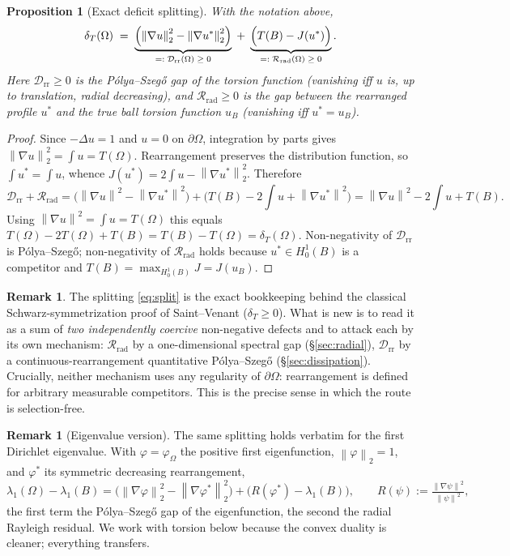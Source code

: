 \documentclass[11pt]{article}
\newtheorem{proposition}[theorem]{Proposition}
\theoremstyle{definition}
\newtheorem{remark}[theorem]{Remark}
\newcommand{\Om}{\Omega}
\newcommand{\Drr}{\mathcal D_{\mathrm{rr}}}
\newcommand{\Rrad}{\mathcal R_{\mathrm{rad}}}
\newcommand{\dT}{\delta_T}
\newcommand{\norm}[1]{\left\|#1\right\|}
\begin{document}
\begin{proposition}[Exact deficit splitting]\label{prop:split}
With the notation above,
\begin{equation}\label{eq:split}
   \dT(\Om)\;=\;\underbrace{\Bigl(\norm{\nabla u}_2^2-\norm{\nabla u^*}_2^2\Bigr)}_{=:\;\Drr(\Om)\;\ge\;0}
   \;+\;\underbrace{\Bigl(T(B)-J(u^*)\Bigr)}_{=:\;\Rrad(\Om)\;\ge\;0}.
\end{equation}
Here $\Drr\ge0$ is the Pólya--Szegő gap of the torsion function (vanishing
iff $u$ is, up to translation, radial decreasing), and $\Rrad\ge0$ is the
gap between the rearranged profile $u^*$ and the true ball torsion function
$u_B$ (vanishing iff $u^*=u_B$).
\end{proposition}

\begin{proof}
Since $-\Delta u=1$ and $u=0$ on $\partial\Om$, integration by parts gives
$\norm{\nabla u}_2^2=\int u=T(\Om)$. Rearrangement preserves the distribution
function, so $\int u^*=\int u$, whence $J(u^*)=2\int u-\norm{\nabla u^*}_2^2$.
Therefore
\[
   \Drr+\Rrad
   =\bigl(\norm{\nabla u}^2-\norm{\nabla u^*}^2\bigr)+\bigl(T(B)-2\!\int u+\norm{\nabla u^*}^2\bigr)
   =\norm{\nabla u}^2-2\!\int u+T(B).
\]
Using $\norm{\nabla u}^2=\int u=T(\Om)$ this equals $T(\Om)-2T(\Om)+T(B)=T(B)-T(\Om)=\dT(\Om)$.
Non-negativity of $\Drr$ is Pólya--Szegő; non-negativity of $\Rrad$ holds
because $u^*\in H^1_0(B)$ is a competitor and $T(B)=\max_{H^1_0(B)}J=J(u_B)$.
\end{proof}

\begin{remark}
The splitting \eqref{eq:split} is the exact bookkeeping behind the classical
Schwarz-symmetrization proof of Saint--Venant ($\dT\ge0$). What is new is to
read it as a sum of \emph{two independently coercive} non-negative defects
and to attack each by its own mechanism: $\Rrad$ by a one-dimensional
spectral gap (\S\ref{sec:radial}), $\Drr$ by a continuous-rearrangement
quantitative Pólya--Szegő (\S\ref{sec:dissipation}). Crucially, neither
mechanism uses any regularity of $\partial\Om$: rearrangement is defined for
arbitrary measurable competitors. This is the precise sense in which the
route is selection-free.
\end{remark}

\begin{remark}[Eigenvalue version]
The same splitting holds verbatim for the first Dirichlet eigenvalue. With
$\varphi=\varphi_\Om$ the positive first eigenfunction, $\norm\varphi_2=1$,
and $\varphi^*$ its symmetric decreasing rearrangement,
\[
   \lambda_1(\Om)-\lambda_1(B)
   =\bigl(\norm{\nabla\varphi}_2^2-\norm{\nabla\varphi^*}_2^2\bigr)
   +\bigl(R(\varphi^*)-\lambda_1(B)\bigr),
   \qquad R(\psi):=\tfrac{\norm{\nabla\psi}^2}{\norm{\psi}^2},
\]
the first term the Pólya--Szegő gap of the eigenfunction, the second the
radial Rayleigh residual. We work with torsion below because the convex
duality is cleaner; everything transfers.
\end{remark}
\end{document}
